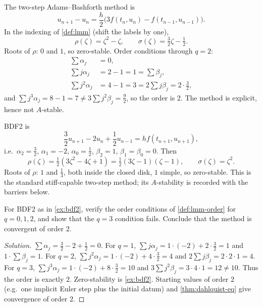 \documentclass[11pt,a4paper]{article}
\begin{document}
\begin{example}
\label{ex:ab2}
The two-step Adams--Bashforth method is
\[
u_{n+1}-u_{n}
=
\frac h2\bigl(3f(t_{n},u_{n})-f(t_{n-1},u_{n-1})\bigr).
\]
In the indexing of \cref{def:lmm} (shift the labels by one),
\[
\rho(\zeta)=\zeta^{2}-\zeta,
\qquad
\sigma(\zeta)=\tfrac32\zeta-\tfrac12.
\]
Roots of \(\rho\): \(0\) and \(1\), so zero-stable. Order conditions through \(q=2\):
\begin{align*}
\sum\alpha_{j}&=0,\\
\sum j\alpha_{j}&=2-1=1=\sum\beta_{j},\\
\sum j^{2}\alpha_{j}&=4-1=3=2\sum j\beta_{j}=2\cdot\tfrac32,
\end{align*}
and \(\sum j^{3}\alpha_{j}=8-1=7\neq 3\sum j^{2}\beta_{j}=\frac92\), so the order is \(2\). The method is explicit, hence not \(A\)-stable.
\end{example}

\begin{example}[BDF2]
\label{ex:bdf2}
BDF2 is
\[
\frac32 u_{n+1}-2u_{n}+\frac12 u_{n-1}
=
h f(t_{n+1},u_{n+1}),
\]
i.e.\ \(\alpha_{2}=\frac32\), \(\alpha_{1}=-2\), \(\alpha_{0}=\frac12\), \(\beta_{2}=1\), \(\beta_{1}=\beta_{0}=0\). Then
\[
\rho(\zeta)=\tfrac12(3\zeta^{2}-4\zeta+1)=\tfrac12(3\zeta-1)(\zeta-1),
\qquad
\sigma(\zeta)=\zeta^{2}.
\]
Roots of \(\rho\): \(1\) and \(\frac13\), both inside the closed disk, \(1\) simple, so zero-stable. This is the standard stiff-capable two-step method; its \(A\)-stability is recorded with the barriers below.
\end{example}

\begin{exercise}
\label{exer:bdf2-order}
For BDF2 as in \cref{ex:bdf2}, verify the order conditions of \cref{def:lmm-order} for \(q=0,1,2\), and show that the \(q=3\) condition fails. Conclude that the method is convergent of order \(2\).
\end{exercise}

\begin{proof}[Solution]
\(\sum\alpha_{j}=\frac32-2+\frac12=0\). For \(q=1\), \(\sum j\alpha_{j}=1\cdot(-2)+2\cdot\frac32=1\) and \(1\cdot\sum\beta_{j}=1\). For \(q=2\), \(\sum j^{2}\alpha_{j}=1\cdot(-2)+4\cdot\frac32=4\) and \(2\sum j\beta_{j}=2\cdot 2\cdot 1=4\). For \(q=3\), \(\sum j^{3}\alpha_{j}=1\cdot(-2)+8\cdot\frac32=10\) and \(3\sum j^{2}\beta_{j}=3\cdot 4\cdot 1=12\neq 10\). Thus the order is exactly \(2\). Zero-stability is \cref{ex:bdf2}. Starting values of order \(2\) (e.g.\ one implicit Euler step plus the initial datum) and \cref{thm:dahlquist-eq} give convergence of order \(2\).
\end{proof}
\end{document}
